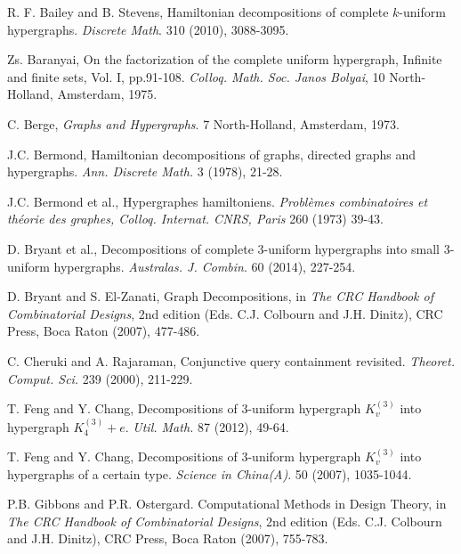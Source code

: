 
\begin{thebibliography}{99}

  R. F. Bailey and B. Stevens,
  Hamiltonian decompositions of complete $k$-uniform hypergraphs.
  {\em Discrete Math}. 310 (2010), 3088-3095.

  Zs. Baranyai,
  On the factorization of the complete uniform hypergraph, Infinite and finite
  sets, Vol. I, pp.91-108.
  {\em Colloq. Math. Soc. Janos Bolyai}, 10 North-Holland, Amsterdam, 1975.

  C. Berge,
  {\em Graphs and Hypergraphs}.
  7 North-Holland, Amsterdam, 1973.

  J.C. Bermond,
  Hamiltonian decompositions of graphs, directed graphs and
  hypergraphs.
  {\em Ann. Discrete Math.} 3 (1978), 21-28.

  J.C. Bermond et al.,
  Hypergraphes hamiltoniens.
  {\em Probl\`{e}mes combinatoires et th\'{e}orie des graphes, Colloq.
  Internat. CNRS, Paris} 260 (1973) 39-43.

  D. Bryant et al.,
  Decompositions of complete 3-uniform hypergraphs into small 3-uniform hypergraphs.
  {\em Australas. J. Combin}. 60 (2014), 227-254.

  D. Bryant and S. El-Zanati,
  Graph Decompositions,
  in {\em The CRC Handbook of Combinatorial Designs}, 2nd edition
  (Eds. C.J. Colbourn and J.H. Dinitz),
  CRC Press, Boca Raton (2007), 477-486.

  C. Cheruki and A. Rajaraman,
  Conjunctive query containment revisited.
  {\em Theoret. Comput. Sci.} 239 (2000), 211-229.
  

  T. Feng and Y. Chang,
  Decompositions of 3-uniform hypergraph $K_v^{(3)}$ into hypergraph $K_4^{(3)}
  + e$.
  {\em Util. Math.} 87 (2012), 49-64.

  T. Feng and Y. Chang,
  Decompositions of 3-uniform hypergraph $K_v^{(3)}$ into hypergraphs of a
  certain type.
  {\em Science in China(A)}. 50 (2007), 1035-1044.

  P.B. Gibbons and P.R. Ostergard.
  Computational Methods in Design Theory,
  in {\em The CRC Handbook of Combinatorial Designs}, 2nd edition
  (Eds. C.J. Colbourn and J.H. Dinitz),
  CRC Press, Boca Raton (2007), 755-783.


\end{thebibliography}
